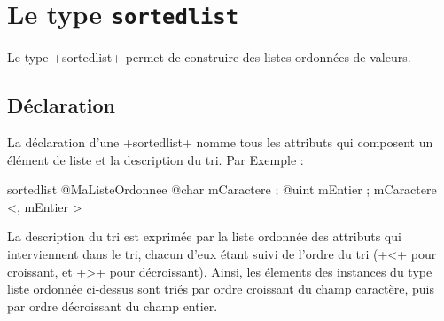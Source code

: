 
\chapter{Le type \texttt{sortedlist}}

Le type \ggs+sortedlist+ permet de construire des listes ordonnées de valeurs.




\section{Déclaration}

La déclaration d'une \ggs+sortedlist+ nomme tous les attributs qui composent un élément de liste et la description du tri. Par Exemple :

\begin{galgascode}
sortedlist @MaListeOrdonnee {
  @char mCaractere ;
  @uint mEntier ;
}{
  mCaractere <, mEntier >
}
\end{galgascode}

La description du tri est exprimée par la liste ordonnée des attributs qui interviennent dans le tri, chacun d'eux étant suivi de l'ordre du tri (\ggs+<+ pour croissant, et \ggs+>+ pour décroissant). Ainsi, les élements des instances du type liste ordonnée ci-dessus sont triés par ordre croissant du champ caractère, puis par ordre décroissant du champ entier.


